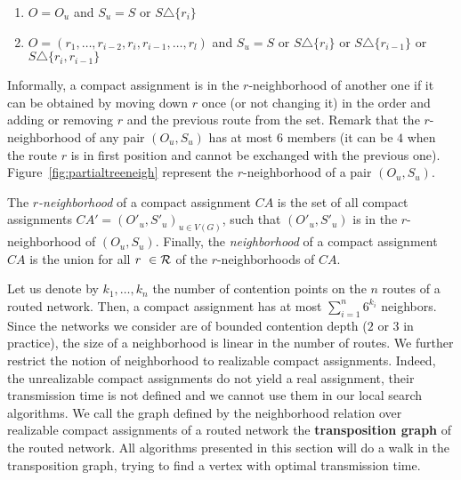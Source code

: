  \begin{enumerate} 
 \item $O = O_u$ and $S_u = S$ or $S \triangle \{r_i\}$  
 \item $O = (r_1,\dots,r_{i-2},r_{i},r_{i-1},\dots,r_{l})$ and $S_u = S$ or $S \triangle \{r_i\}$ or  $S \triangle \{r_{i-1}\}$ or $S \triangle \{r_i,r_{i-1}\}$ 
 \end{enumerate}

Informally, a compact assignment is in the $r$-neighborhood of another one if it can be obtained by 
moving down $r$ once (or not changing it) in the order and adding or removing $r$ and the previous route from the set. 
Remark that the $r$-neighborhood of any pair $(O_u,S_u)$ has at most $6$ members (it can be $4$ when the route $r$ is in first position and cannot be exchanged with the previous one). Figure~\ref{fig:partialtreeneigh} represent the $r$-neighborhood of a pair $(O_u,S_u)$.

The \emph{$r$-neighborhood} of a compact assignment $CA$ is the set of all compact assignments $CA'=(O'_u,S'_u)_{u \in V(G)}$, such that  $(O'_u,S'_u)$ is in the $r$-neighborhood of $(O_u,S_u)$. Finally, the \emph{neighborhood} of a compact assignment $CA$ is the union for all $r \in {\cal R}$ of the $r$-neighborhoods of $CA$.  

 Let us denote by $k_1,\ldots,k_n$ the number of contention points on the $n$ routes of 
 a routed network. Then, a compact assignment has at most $\sum_{i=1}^n 6^{k_i}$ neighbors. Since the networks we consider are of bounded contention depth ($2$ or $3$ in practice), the size of a neighborhood is linear in the number of routes.  We further restrict the notion of neighborhood to realizable compact assignments. Indeed, the unrealizable compact assignments do not yield a real assignment, their transmission time is not defined and we cannot use them in our local search algorithms. We call the graph defined by the neighborhood relation over realizable compact assignments of a routed network the {\bf transposition graph} of the routed network. 
  All algorithms presented in this section will do a walk in the transposition graph, trying to find a vertex with optimal
  transmission time. 

